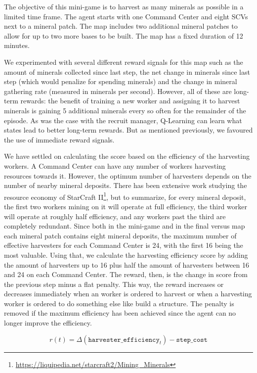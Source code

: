 The objective of this mini-game is to harvest as many minerals as possible in a limited time frame. The agent starts with one Command Center and eight SCVs next to a mineral patch. The map includes two additional mineral patches to allow for up to two more bases to be built. The map has a fixed duration of 12 minutes.

We experimented with several different reward signals for this map such as the amount of minerals collected since last step, the net change in minerals since last step (which would penalize for spending minerals) and the change in mineral gathering rate (measured in minerals per second). However, all of these are long-term rewards: the benefit of training a new worker and assigning it to harvest minerals is gaining 5 additional minerals every so often for the remainder of the episode. As was the case with the recruit manager, Q-Learning can learn what states lead to better long-term rewards. But as mentioned previously, we favoured the use of immediate reward signals.

We have settled on calculating the score based on the efficiency of the harvesting workers. A Command Center can have any number of workers harvesting resources towards it. However, the optimum number of harvesters depends on the number of nearby mineral deposits. There has been extensive work studying the resource economy of StarCraft II\footnote{\url{https://liquipedia.net/starcraft2/Mining_Minerals}}, but to summarize, for every mineral deposit, the first two workers mining on it will operate at full efficiency, the third worker will operate at roughly half efficiency, and any workers past the third are completely redundant. Since both in the mini-game and in the final versus map each mineral patch contains eight mineral deposits, the maximum number of effective harvesters for each Command Center is 24, with the first 16 being the most valuable. Using that, we calculate the harvesting efficiency score by adding the amount of harvesters up to 16 plus half the amount of harvesters between 16 and 24 on each Command Center. The reward, then, is the change in score from the previous step minus a flat penalty. This way, the reward increases or decreases immediately when an worker is ordered to harvest or when a harvesting worker is ordered to do something else like build a structure. The penalty is removed if the maximum efficiency has been achieved since the agent can no longer improve the efficiency.

$$
r(t) = \Delta(\texttt{harvester\_efficiency}_{t}) - \texttt{step\_cost}
$$


